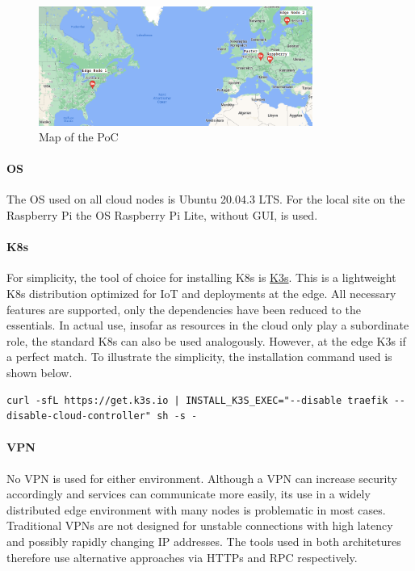 \documentclass[MSC,Master,english]{twbook}%
\begin{document}
\begin{figure}[ht]
    \centering
    \includegraphics[width=0.80\textwidth]{PICs/poc-map.png}
    \caption{Map of the \ac{PoC}\cite{googlemaps}}
    \label{fig:poc-map}
\end{figure}

\paragraph{OS} The \ac{OS} used on all cloud nodes is Ubuntu 20.04.3 LTS. For the local site on the Raspberry Pi the \ac{OS} Raspberry Pi Lite, without \ac{GUI}, is used.

\paragraph{\ac{K8s}} For simplicity, the tool of choice for installing \ac{K8s} is \hyperref{https://k3s.io/}{}{}{K3s}. This is a lightweight \ac{K8s} distribution optimized for \ac{IoT} and deployments at the edge. All necessary features are supported, only the dependencies have been reduced to the essentials. In actual use, insofar as resources in the cloud only play a subordinate role, the standard \ac{K8s} can also be used analogously. However, at the edge K3s if a perfect match. To illustrate the simplicity, the installation command used is shown below. 

\begin{lstlisting}[caption={K3s installation},captionpos=b]
curl -sfL https://get.k3s.io | INSTALL_K3S_EXEC="--disable traefik --disable-cloud-controller" sh -s -
\end{lstlisting}

\paragraph{VPN} No \ac{VPN} is used for either environment. Although a VPN can increase security accordingly and services can communicate more easily, its use in a widely distributed edge environment with many nodes is problematic in most cases. Traditional VPNs are not designed for unstable connections with high latency and possibly rapidly changing \ac{IP} addresses. The tools used in both architetures therefore use alternative approaches via HTTPs and RPC respectively.
\end{document}

